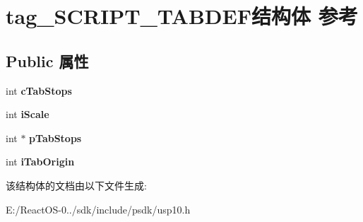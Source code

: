 \hypertarget{structtag___s_c_r_i_p_t___t_a_b_d_e_f}{}\section{tag\+\_\+\+S\+C\+R\+I\+P\+T\+\_\+\+T\+A\+B\+D\+E\+F结构体 参考}
\label{structtag___s_c_r_i_p_t___t_a_b_d_e_f}
\subsection*{Public 属性}
\begin{DoxyCompactItemize}
\item 
\mbox{\label{structtag___s_c_r_i_p_t___t_a_b_d_e_f_af8f13776d2a443ec6066d0cc103f1f10}} 
int {\bfseries c\+Tab\+Stops}
\item 
\mbox{\label{structtag___s_c_r_i_p_t___t_a_b_d_e_f_ae31397224c8628eaa4f10cd5e5df696a}} 
int {\bfseries i\+Scale}
\item 
\mbox{\label{structtag___s_c_r_i_p_t___t_a_b_d_e_f_a5e984b514291e2e7535d76423a993f76}} 
int $\ast$ {\bfseries p\+Tab\+Stops}
\item 
\mbox{\label{structtag___s_c_r_i_p_t___t_a_b_d_e_f_a747a8661718cd0681a9395739f5d2e83}} 
int {\bfseries i\+Tab\+Origin}
\end{DoxyCompactItemize}


该结构体的文档由以下文件生成\+:\begin{DoxyCompactItemize}
\item 
E\+:/\+React\+O\+S-\/0../sdk/include/psdk/usp10.\+h\end{DoxyCompactItemize}
